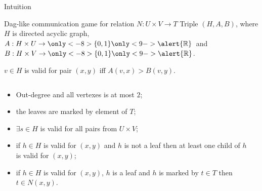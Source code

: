 \begin{frame}{Intuition}


\end{frame}


\begin{frame}{Dag-like  communication game for relation $N: U \times V \to T$}
    Triple $(H, A, B)$, where $H$ is directed acyclic graph, $A: H \times U \to \only<-8>{\{0, 1\}}
    \only<9->{\alert{\mathbb{R}}}$~and $B: H \times V \to \only<-8>{\{0, 1\}} \only<9->{\alert{\mathbb{R}}}$.

    \pause
    $v \in H$ is valid for pair $(x, y)$ iff $A(v, x) > B(v, y)$.

    \pause

    \begin{columns}[t]
		\begin{column}{0.7\textwidth}
            \begin{itemize}
                \item<4-> Out-degree and all vertexes is at most $2$;
	            \item<5-> the leaves are marked by element of $T$;
    		    \item<6-> $\exists s \in H$ is valid for all pairs from $U \times V$;
		        \item<7-> if $h \in H$ is valid for $(x, y)$ and $h$ is not a leaf then at least one child of $h$ is valid for
	    	        $(x, y)$;
	    	    \item<8-> if $h \in H$ is valid for $(x, y)$, $h$ is a leaf and $h$ is marked by $t \in T$ then $t \in N(x, y)$.
	        \end{itemize}

        \end{column}
        
		\begin{column}{0.25\textwidth}
            
		\end{column}
	\end{columns}

\end{frame}

